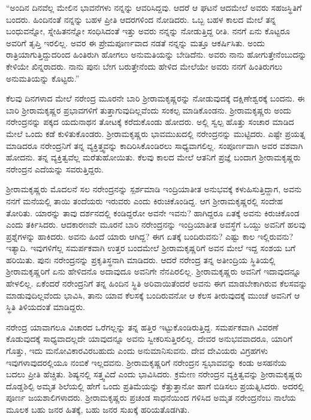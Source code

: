 \vskip 2pt

“ಅಂದಿನ ದಿನವೆಲ್ಲ ಮೇಲಿನ ಭಾವನೆಗಳು ನನ್ನನ್ನು ಆವರಿಸಿದ್ದವು. ಆದರೆ ಆ ಘಟನೆ ಆದಮೇಲೆ ಅವರು ಸಹಜಸ್ಥಿತಿಗೆ ಬಂದರು. ಹಿಂದಿನಂತೆ ನನ್ನನ್ನು ಬಹಳ ಪ್ರೀತಿ ಆದರಗಳಿಂದ ನೋಡಿದರು. ಒಬ್ಬ ಬಹಳ ಕಾಲದ ಮೇಲೆ ತನ್ನ ಬಂಧುವನ್ನೋ, ಸ್ನೇಹಿತನನ್ನೋ ಸಂಧಿಸಿದಂತೆ ಇತ್ತು ಅವರು ನನ್ನನ್ನು ನೋಡುತ್ತಿದ್ದ ರೀತಿ. ನನಗೆ ಏನು ಕೊಟ್ಟರೂ ಅವರಿಗೆ ತೃಪ್ತಿ ಇರಲಿಲ್ಲ. ಅವರ ಈ ಪ್ರೇಮಪೂರ್ಣವಾದ ನಡತೆ ನನ್ನನ್ನು ಮತ್ತೂ ಆಕರ್ಷಿಸಿತು. ಅಂದು ರಾತ್ರಿಯಾಗುತ್ತಿದ್ದುದರಿಂದ ಹಿಂತಿರುಗಿ ಹೋಗಲು ಅನುಮತಿಯನ್ನು ಬೇಡಿದೆನು. ಅವರು ನಾನು ಹೋಗುತ್ತೇನೆಂಬುದನ್ನು ಕೇಳಿಯೇ ಖಿನ್ನರಾದರು. ನಾನು ಪುನಃ ಬೇಗ ಬರುತ್ತೇನೆಂದು ಹೇಳಿದ ಮೇಲೆಯೇ ಅವರು ನನಗೆ ಹಿಂತಿರುಗಲು ಅನುಮತಿಯನ್ನು ಕೊಟ್ಟರು.”

\vskip 2pt

ಕೆಲವು ದಿನಗಳಾದ ಮೇಲೆ ನರೇಂದ್ರ ಮೂರನೇ ಬಾರಿ ಶ‍್ರೀರಾಮಕೃಷ್ಣರನ್ನು ನೋಡುವುದಕ್ಕೆ ದಕ್ಷಿಣೇಶ್ವರಕ್ಕೆ ಬಂದನು. ಈ ಬಾರಿ ಶ‍್ರೀರಾಮಕೃಷ್ಣರ ಪ್ರಭಾವಗಳಿಗೆ ತುತ್ತಾಗುವುದಿಲ್ಲವೆಂದು ಸಂಕಲ್ಪ ಮಾಡಿಕೊಂಡನು. ಶ‍್ರೀರಾಮಕೃಷ್ಣರು ಅಂದು ನರೇಂದ್ರನನ್ನು ಪಕ್ಕದ ಯದುನಾಥನ ತೋಟಕ್ಕೆ ಕರೆದುಕೊಂಡು ಹೋದರು. ಅಲ್ಲಿ ಸ್ವಲ್ಪ ಹೊತ್ತು ಸಂಚಾರ ಮಾಡಿದ ಮೇಲೆ ಒಂದು ಕಡೆ ಕುಳಿತುಕೊಂಡರು. ಶ‍್ರೀರಾಮಕೃಷ್ಣರು ಭಾವಮುಖದಲ್ಲಿ ನರೇಂದ್ರನನ್ನು ಮುಟ್ಟಿದರು. ಎಷ್ಟೇ ಪ್ರಯತ್ನ ಮಾಡಿದರೂ ನರೇಂದ್ರನಿಗೆ ತನ್ನ ವ್ಯಕ್ತಿತ್ತ್ವವನ್ನು ಕಾದಿರಿಸಿಕೊಂಡಿರಲು ಸಾಧ್ಯವಾಗಲಿಲ್ಲ. ಸಂಪೂರ್ಣವಾಗಿ ಅವರ ವಶವಾಗಿ ಹೋದನು. ತನ್ನ ವ್ಯಕ್ತಿತ್ವವೆಲ್ಲ ಮರೆತುಹೋಯಿತು. ಕೆಲವು ಕಾಲದ ಮೇಲೆ ಆತನಿಗೆ ಪ್ರಜ್ಞೆ ಬಂದಾಗ ಶ‍್ರೀರಾಮಕೃಷ್ಣರು ನರೇಂದ್ರನ ಎದೆಯನ್ನು ಸವರುತ್ತಿದ್ದರು.

ಶ‍್ರೀರಾಮಕೃಷ್ಣರು ಮೊದಲನೆ ಸಲ ನರೇಂದ್ರನನ್ನು ಸ್ಪರ್ಶಮಾಡಿ ಇಂದ್ರಿಯಾತೀತ ಅನುಭವಕ್ಕೆ ಕಳುಹಿಸುತ್ತಿದ್ದಾಗ, ಅವನು ನನಗೆ ಮನೆಯಲ್ಲಿ ತಾಯಿ ತಂದೆಯರು ಇರುವರು ಎಂದು ಕಿರುಚಿಕೊಂಡಿದ್ದ. ಆಗ ಶ‍್ರೀರಾಮಕೃಷ್ಣರಲ್ಲಿ ಸಂದೇಹ ತೋರಿತು. ಯಾರನ್ನು ತಾವು ದರ್ಶನದಲ್ಲಿ ಕಂಡಿದ್ದರೋ ಅವನೇ ಇವನು? ಹಾಗಿದ್ದರೂ ಏತಕ್ಕೆ ಅವನು ಕಿರುಚಿಕೊಂಡ ಎಂದು ತರ್ಕಿಸಿದರು. ಆದಕಾರಣವೇ ಮೂರನೆ ಬಾರಿ ನರೇಂದ್ರನನ್ನು ಇಂದ್ರಿಯಾತೀತ ಅವಸ್ಥೆಗೆ ಒಯ್ದು ಅವನಿಗೆ ಹಲವು ಪ್ರಶ್ನೆಗಳನ್ನು ಹಾಕಿದರು. ಅವನು ಹಿಂದೆ ಯಾರು ಆಗಿದ್ದ? ಈಗ ಏತಕ್ಕೆ ಬಂದಿರುವನು? ಎಷ್ಟು ಕಾಲ ಇಲ್ಲಿರುವನು? ಇತ್ಯಾದಿ. ಇವುಗಳಿಗೆಲ್ಲ ಸಮರ್ಪಕವಾಗಿ ಉತ್ತರ ಬಂದಮೇಲೆ ಶ‍್ರೀರಾಮಕೃಷ್ಣರಿಗೆ ಅವನ ಮೇಲೆ ಇದ್ದ ಸಂಶಯ ಬಗೆ ಹರಿಯಿತು. ಪುನಃ ನರೇಂದ್ರನನ್ನು ಪ್ರಕೃತಿಸ್ಥನಾಗಿ ಮಾಡಿದರು. ಆದರೆ ನರೇಂದ್ರ ತನ್ನ ಅತೀಂದ್ರಿಯ ಸ್ಥಿತಿಯಲ್ಲಿ ಶ‍್ರೀರಾಮಕೃಷ್ಣರಿಗೆ ಏನು ಹೇಳಿದನೊ ಅದಾವುದೂ ಅವನಿಗೇ ನೆನಪಿರಲಿಲ್ಲ. ಶ‍್ರೀರಾಮಕೃಷ್ಣರು ಅವನಿಗೆ ಇದಾವುದನ್ನೂ ಹೇಳಲಿಲ್ಲ. ಏಕೆಂದರೆ ನರೇಂದ್ರನಿಗೆ ತನ್ನ ಹಿಂದಿನ ಸ್ಥಿತಿ ಅರಿವಾಯಿತೆಂದರೆ ಅವನು ಈಗ ಮಾಡಬೇಕಾಗಿರುವ ಕೆಲಸವನ್ನು ಮಾಡುವುದಿಲ್ಲವೆಂದು ಭಾವಿಸಿ, ತಾನು ಯಾವ ಕೆಲಸಕ್ಕೆ ಬಂದಿರುವನೋ ಆ ಕೆಲಸ ತೀರುವುದಕ್ಕೆ ಮುಂಚೆ ಅವನಿಗೆ ಆ ಸ್ಥಿತಿ ತಿಳಿಯದಂತೆ ಮಾಡಿದ್ದರು.

ನರೇಂದ್ರ ಯಾವಾಗಲೂ ವಿಚಾರದ ಒರೆಗಲ್ಲನ್ನು ತನ್ನ ಹತ್ತಿರ ಇಟ್ಟುಕೊಂಡಿರುತ್ತಿದ್ದ. ಸಮರ್ಪಕವಾಗಿ ವಿವರಣೆ ಕೊಡುವುದಕ್ಕೆ ಸಾಧ್ಯವಾದಲ್ಲದೇ ಯಾವುದನ್ನೂ ಅವನು ಸ್ವೀಕರಿಸುತ್ತಿರಲಿಲ್ಲ. ದೇವರ ಅನುಭವವಾದರೂ, ಯಾರಿಗೆ ಗೊತ್ತು, ಇದು ಮನೋವಿಕಾರವಿರಬಹುದು ಎಂದು ಅನುಮಾನಿಸುವನು. ದೇವ ದೇವಿಯರು ವಿಗ್ರಹಗಳು ಇವುಗಳಾವುದರಲ್ಲಿಯೂ ನಂಬಿಕೆ ಇಲ್ಲದವನು. ಶ‍್ರೀರಾಮಕೃಷ್ಣರಿಗೆ ನರೇಂದ್ರನ ಸ್ವಭಾವವನ್ನು ಕಂಡು ಅಸಹನೆಯ ಬದಲು ಪ್ರೀತಿ ಹೆಚ್ಚಿತು. ಶಿಷ್ಯನಲ್ಲಿ ಸತ್ತ್ವವಿದೆ ಎಂದು ಭಾವಿಸಿದರು. ಕ್ರಮೇಣ ನರೇಂದ್ರನ ವ್ಯಕ್ತಿತ್ವವನ್ನು ಶ‍್ರೀರಾಮಕೃಷ್ಣರು ದೊಡ್ಡಶಿಲ್ಪಿ ಅಮೃತ ಶಿಲೆಯಲ್ಲಿ ಹೇಗೆ ಒಂದು ಪ್ರತಿಮೆಯನ್ನು ಕೆತ್ತುತ್ತಾನೋ ಹಾಗೆ ಬಿಡಿಸಲು ಪ್ರಯತ್ನಿಸಿದರು. ಅದರಲ್ಲಿ ಪೂರ್ಣ ಜಯಶಾಲಿಗಳಾದರು. ಶ‍್ರೀರಾಮಕೃಷ್ಣರು ಪ್ರಚಂಡ ಸಾಧನೆಯಿಂದ ಗಳಿಸಿದ ಅಮೃತ ನರೇಂದ್ರನೆಂಬ ನಾಲೆಯ ಮೂಲಕ ಬಹು ಜನರ ಹಿತಕ್ಕೆ, ಬಹು ಜನರ ಸುಖಕ್ಕೆ ಹರಿಯತೊಡಗಿತು.


